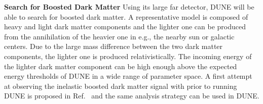 {\bf Search for Boosted Dark Matter}
Using its large far detector, DUNE will be able to search for boosted dark matter.
A representative model is composed of heavy and light  dark matter components and the lighter one can be produced from the annihilation of the heavier one in e.g., the nearby sun or galactic centers.
Due to the large mass difference between the two  dark matter components, the lighter one is produced relativistically.
The incoming energy of the lighter  dark matter component can be high enough above the expected energy thresholds of DUNE in a wide range of parameter space. 
A first attempt at observing the inelastic boosted dark matter signal with  prior to running DUNE is proposed in Ref.~\cite{Chatterjee:2018mej} and the same analysis strategy can be used in DUNE.


